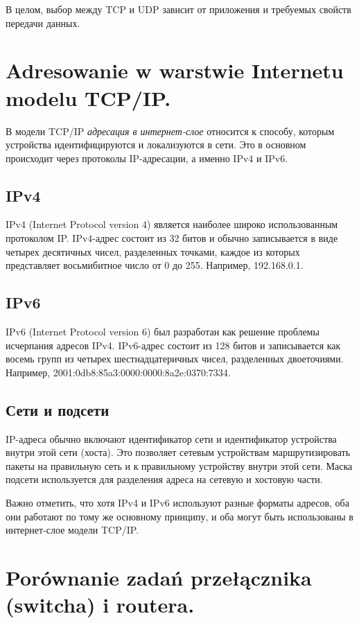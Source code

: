 В целом, выбор между TCP и UDP зависит от приложения и требуемых свойств передачи данных.

\section{Adresowanie w warstwie Internetu modelu TCP/IP. }

В модели TCP/IP \textit{адресация в интернет-слое} относится к способу, которым устройства идентифицируются и локализуются в сети. Это в основном происходит через протоколы IP-адресации, а именно IPv4 и IPv6.

\subsection{IPv4}

IPv4 (Internet Protocol version 4) является наиболее широко использованным протоколом IP. IPv4-адрес состоит из 32 битов и обычно записывается в виде четырех десятичных чисел, разделенных точками, каждое из которых представляет восьмибитное число от 0 до 255. Например, 192.168.0.1.

\subsection{IPv6}

IPv6 (Internet Protocol version 6) был разработан как решение проблемы исчерпания адресов IPv4. IPv6-адрес состоит из 128 битов и записывается как восемь групп из четырех шестнадцатеричных чисел, разделенных двоеточиями. Например, 2001:0db8:85a3:0000:0000:8a2e:0370:7334.

\subsection{Сети и подсети}

IP-адреса обычно включают идентификатор сети и идентификатор устройства внутри этой сети (хоста). Это позволяет сетевым устройствам маршрутизировать пакеты на правильную сеть и к правильному устройству внутри этой сети. Маска подсети используется для разделения адреса на сетевую и хостовую части.

Важно отметить, что хотя IPv4 и IPv6 используют разные форматы адресов, оба они работают по тому же основному принципу, и оба могут быть использованы в интернет-слое модели TCP/IP.


\section{Porównanie zadań przełącznika (switcha) i routera.}

